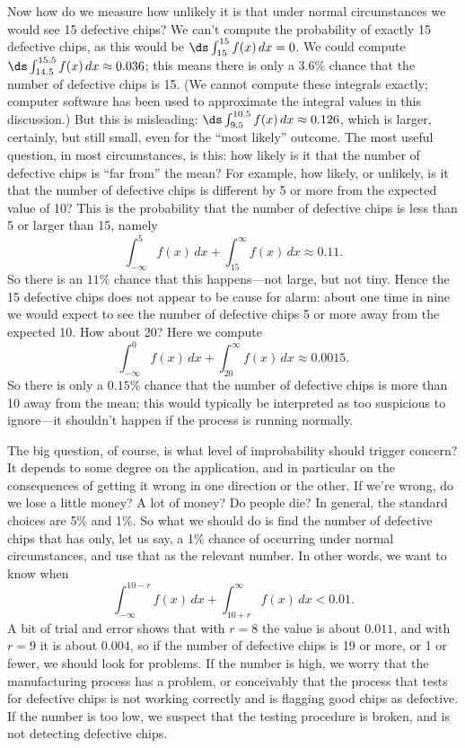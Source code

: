 Now how do we measure how unlikely it is that under normal
circumstances we would see 15 defective chips? We can't compute the
probability of exactly 15 defective chips, as this would be
$\ds\int_{15}^{15} f(x)\,dx = 0$. We could compute
$\ds\int_{14.5}^{15.5} f(x)\,dx \approx 0.036$; this means there is
only a $3.6\%$ chance that the number of defective chips is 15. (We
cannot compute these integrals exactly; computer software has been
used to approximate the integral values in this discussion.)
But
this is misleading:
$\ds\int_{9.5}^{10.5} f(x)\,dx \approx 0.126$, which is larger,
certainly, but still small, even for the ``most likely'' outcome. The
most useful question, in most circumstances, is this: how likely is it that
the number of defective chips is ``far from'' the mean? For example,
how likely, or unlikely, is it that the number of defective chips is
different by 5 or more from the expected value of 10? This is the
probability that the number of defective chips is less than 5 or
larger than 15, namely
$$
  \int_{-\infty}^{5} f(x)\,dx + \int_{15}^{\infty} f(x)\,dx \approx 0.11.
$$ 
So there is an $11\%$ chance that this happens---not large, but not
tiny. Hence the 15 defective chips does not appear to be cause for
alarm: about one time in nine we would expect to see the number of
defective chips 5 or more away from the expected 10. How about 20?
Here we compute
$$
  \int_{-\infty}^{0} f(x)\,dx + \int_{20}^{\infty} f(x)\,dx \approx 0.0015.
$$
So there is only a $0.15\%$ chance that the number of defective chips
is more than 10 away from the mean; this would typically be
interpreted as too suspicious to ignore---it shouldn't happen if the
process is running normally. 

The big question, of course, is what level of improbability should
trigger concern? It depends to some degree on the application, and in
particular on the consequences of getting it wrong in one direction or
the other. If we're wrong, do we lose a little money? A lot of money?
Do people die? In general, the standard choices are 5\% and 1\%. So
what we should do is find the number of defective chips that has only,
let us say, a 1\% chance of occurring under normal circumstances, and
use that as the relevant number. In other words, we want to know when
$$
  \int_{-\infty}^{10-r} f(x)\,dx + \int_{10+r}^{\infty} f(x)\,dx < 0.01.
$$ 
A bit of trial and error shows that with $r=8$ the value is about
$0.011$, and with $r=9$ it is about $0.004$, so if the number of
defective chips is 19 or more, or 1 or fewer, we should look for
problems. If the number is high, we worry that the manufacturing
process has a problem, or conceivably that the process that tests for
defective chips is not working correctly and is flagging good chips as
defective. If the number is too low, we suspect that the testing
procedure is broken, and is not detecting defective chips.

